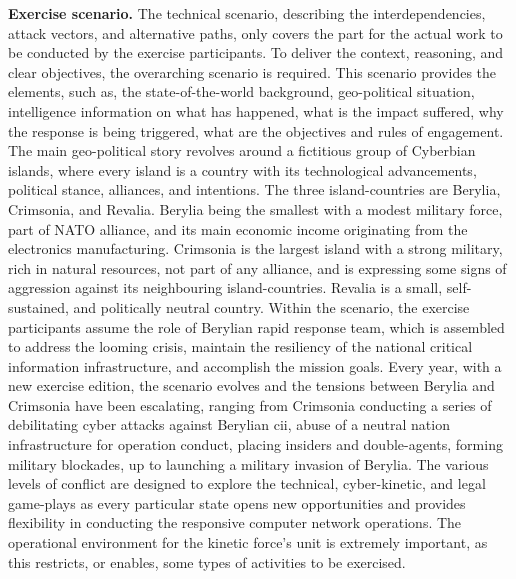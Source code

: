 \textbf{Exercise scenario.}
The technical scenario, describing the interdependencies, attack vectors, and alternative paths, only covers the part for the actual work to be conducted by the exercise participants. To deliver the context, reasoning, and clear objectives, the overarching scenario is required. This scenario provides the elements, such as, the state-of-the-world background, geo-political situation, intelligence information on what has happened, what is the impact suffered, why the response is being triggered, what are the objectives and rules of engagement.
The main geo-political story revolves around a fictitious group of Cyberbian islands, where every island is a country with its technological advancements, political stance, alliances, and intentions. The three island-countries are Berylia, Crimsonia, and Revalia. Berylia being the smallest with a modest military force, part of NATO alliance, and its main economic income originating from the electronics manufacturing. Crimsonia is the largest island with a strong military, rich in natural resources, not part of any alliance, and is expressing some signs of aggression against its neighbouring island-countries. Revalia is a small, self-sustained, and politically neutral country. Within the scenario, the exercise participants assume the role of Berylian rapid response team, which is assembled to address the looming crisis, maintain the resiliency of the national critical information infrastructure, and accomplish the mission goals.
Every year, with a new exercise edition, the scenario evolves and the tensions between Berylia and Crimsonia have been escalating, ranging from Crimsonia conducting a series of debilitating cyber attacks against Berylian \gls{cii}, abuse of a neutral nation infrastructure for operation conduct, placing insiders and double-agents, forming military blockades, up to launching a military invasion of Berylia. The various levels of conflict are designed to explore the technical, cyber-kinetic, and legal game-plays as every particular state opens new opportunities and provides flexibility in conducting the responsive computer network operations. The operational environment for the kinetic force's unit is extremely important, as this restricts, or enables, some types of activities to be exercised.

